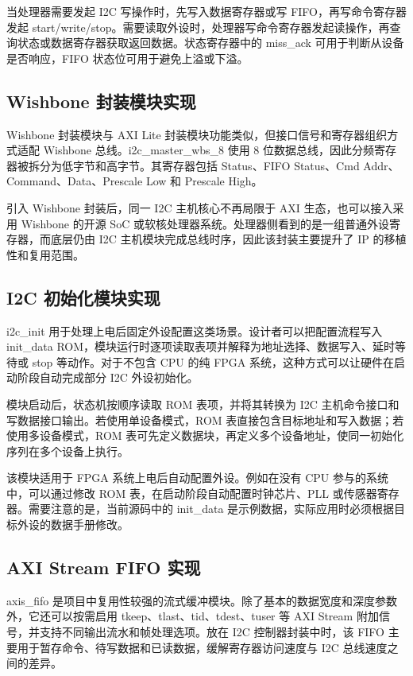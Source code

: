 \documentclass[12pt,a4paper]{article}
\numberwithin{equation}{section}
\begin{document}
当处理器需要发起 I2C 写操作时，先写入数据寄存器或写
FIFO，再写命令寄存器发起
start/write/stop。需要读取外设时，处理器写命令寄存器发起读操作，再查询状态或数据寄存器获取返回数据。状态寄存器中的
miss\_ack 可用于判断从设备是否响应，FIFO
状态位可用于避免上溢或下溢。

\subsection{Wishbone
封装模块实现}\label{wishbone-ux5c01ux88c5ux6a21ux5757ux5b9eux73b0}

Wishbone 封装模块与 AXI Lite
封装模块功能类似，但接口信号和寄存器组织方式适配 Wishbone
总线。i2c\_master\_wbs\_8 使用 8
位数据总线，因此分频寄存器被拆分为低字节和高字节。其寄存器包括
Status、FIFO Status、Cmd Addr、Command、Data、Prescale Low 和 Prescale
High。

引入 Wishbone 封装后，同一 I2C 主机核心不再局限于 AXI
生态，也可以接入采用 Wishbone 的开源 SoC
或软核处理器系统。处理器侧看到的是一组普通外设寄存器，而底层仍由 I2C
主机模块完成总线时序，因此该封装主要提升了 IP 的移植性和复用范围。

\subsection{I2C
初始化模块实现}\label{i2c-ux521dux59cbux5316ux6a21ux5757ux5b9eux73b0}

i2c\_init
用于处理上电后固定外设配置这类场景。设计者可以把配置流程写入
init\_data
ROM，模块运行时逐项读取表项并解释为地址选择、数据写入、延时等待或 stop
等动作。对于不包含 CPU 的纯 FPGA
系统，这种方式可以让硬件在启动阶段自动完成部分 I2C 外设初始化。

模块启动后，状态机按顺序读取 ROM 表项，并将其转换为 I2C
主机命令接口和写数据接口输出。若使用单设备模式，ROM
表直接包含目标地址和写入数据；若使用多设备模式，ROM
表可先定义数据块，再定义多个设备地址，使同一初始化序列在多个设备上执行。

该模块适用于 FPGA 系统上电后自动配置外设。例如在没有 CPU
参与的系统中，可以通过修改 ROM 表，在启动阶段自动配置时钟芯片、PLL
或传感器寄存器。需要注意的是，当前源码中的
init\_data
是示例数据，实际应用时必须根据目标外设的数据手册修改。

\subsection{AXI Stream FIFO
实现}\label{axi-stream-fifo-ux5b9eux73b0}

axis\_fifo
是项目中复用性较强的流式缓冲模块。除了基本的数据宽度和深度参数外，它还可以按需启用
tkeep、tlast、tid、tdest、tuser
等 AXI Stream 附加信号，并支持不同输出流水和帧处理选项。放在 I2C
控制器封装中时，该 FIFO
主要用于暂存命令、待写数据和已读数据，缓解寄存器访问速度与 I2C
总线速度之间的差异。
\end{document}
